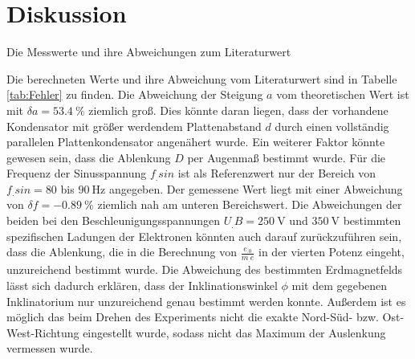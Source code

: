 \section{Diskussion}
\label{sec:Diskussion}

\begin{table}
\centering
\caption{Die Messwerte und ihre Abweichungen zum Literaturwert}

\label{tab:Fehler}
\end{table}

\noindent Die berechneten Werte und ihre Abweichung vom Literaturwert sind in Tabelle \ref{tab:Fehler} zu finden.
Die Abweichung der Steigung $a$ vom theoretischen Wert ist mit $\delta a=\SI{53,4}{\percent}$ ziemlich groß. Dies könnte daran liegen, dass der vorhandene Kondensator mit größer werdendem Plattenabstand $d$ durch einen vollständig parallelen Plattenkondensator angenähert wurde. Ein weiterer Faktor könnte gewesen sein, dass die Ablenkung $D$ per Augenmaß bestimmt wurde.
Für die Frequenz der Sinusspannung $f_.{sin}$ ist als Referenzwert nur der Bereich von $f_.{sin}=80$ bis $\SI{90}{\hertz}$ angegeben. Der gemessene Wert liegt mit einer Abweichung von $\delta f =\SI{-0,89}{\percent}$ ziemlich nah am unteren Bereichswert. 
Die Abweichungen der beiden bei den Beschleunigungsspannungen $U_.B=\SI{250}{\volt}$ und $\SI{350}{\volt}$ bestimmten spezifischen Ladungen der Elektronen könnten auch darauf zurückzuführen sein, dass die Ablenkung, die in die Berechnung von $\frac{e_.0}{m_.e}$ in der vierten Potenz eingeht, unzureichend bestimmt wurde.
\newline Die Abweichung des bestimmten Erdmagnetfelds lässt sich dadurch erklären, dass der Inklinationswinkel $\phi$ mit dem gegebenen Inklinatorium nur unzureichend genau bestimmt werden konnte. Außerdem ist es möglich das beim Drehen des Experiments nicht die exakte Nord-Süd- bzw. Ost-West-Richtung eingestellt wurde, sodass nicht das Maximum der Auslenkung vermessen wurde.